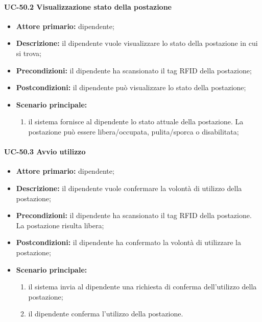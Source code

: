\paragraph{UC-50.2 Visualizzazione stato della postazione}

\begin{itemize}
    \item \textbf{Attore primario:} dipendente;

    \item \textbf{Descrizione:} il dipendente vuole visualizzare lo stato della postazione in cui si trova;

    \item \textbf{Precondizioni:} il dipendente ha scansionato il tag RFID della postazione;

    \item \textbf{Postcondizioni:} il dipendente può visualizzare lo stato della postazione;

    \item \textbf{Scenario principale:}
        \begin{enumerate}
            \item il sistema fornisce al dipendente lo stato attuale della postazione. La postazione può essere libera/occupata, pulita/sporca o disabilitata;
        \end{enumerate}
\end{itemize}

\paragraph{UC-50.3 Avvio utilizzo}

    \begin{itemize}
        \item \textbf{Attore primario:} dipendente;

        \item \textbf{Descrizione:} il dipendente vuole confermare la volontà di utilizzo della postazione;

        \item \textbf{Precondizioni:} il dipendente ha scansionato il tag RFID della postazione. La postazione risulta libera;

        \item \textbf{Postcondizioni:} il dipendente ha confermato la volontà di utilizzare la postazione;

        \item \textbf{Scenario principale:}
            \begin{enumerate}
                \item il sistema invia al dipendente una richiesta di conferma dell'utilizzo della postazione;
                \item il dipendente conferma l'utilizzo della postazione.
            \end{enumerate}
    \end{itemize}

